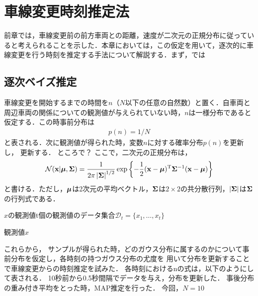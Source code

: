 
\chapter{車線変更時刻推定法}
前章では，車線変更前の前方車両との距離，速度が二次元の正規分布に従っていると考えられることを示した．本章においては，この仮定を用いて，逐次的に車線変更を行う時刻を推定する手法について解説する．まず，では
\section{逐次ベイズ推定}
車線変更を開始するまでの時間を$n$（$N$以下の任意の自然数）と置く．自車両と周辺車両の関係についての観測値が与えられていない時，$n$は一様分布であると仮定する．この時事前分布は
\begin{align}
p(n)=1/N
\end{align}
と表される．次に観測値が得られた時，変数$n$に対する確率分布$p(n)$を更新し，
更新する．
ところで？
ここで，二次元の正規分布は，
\begin{align}
\mathcal{N}(\mathbf{x}|\boldsymbol{\mu},\mathbf{\Sigma})=\frac{1}{2\pi\left|\mathbf{\Sigma}\right|^{1/2}}\exp\left\{-\frac{1}{2}(\mathbf{x}-\boldsymbol{\mu})^\mathrm{T}\mathbf{\Sigma}^{-1}(\mathbf{x}-\boldsymbol{\mu})\right\}
\end{align}
と書ける．ただし，$\boldsymbol{\mu}$は2次元の平均ベクトル，$\mathbf{\Sigma}$は$2\times2$の共分散行列，$\left|\mathbf{\Sigma}\right|$は$\mathbf{\Sigma}$の行列式である．

$x$の観測値t個の観測値のデータ集合$\mathcal{D}_t=\{x_1,\ldots,x_t\}$

観測値$x$

これらから，
サンプルが得られた時，どのガウス分布に属するのかについて事前分布を仮定し，各時刻の持つガウス分布の尤度を
用いて分布を更新することで車線変更からの時刻推定を試みた．
各時刻におけるnの式は，以下のようにして表される．
10秒前から0.5秒間隔でデータを与え，分布を更新した．
事後分布の重み付き平均をとった時，MAP推定を行った．
今回，$N=10$
